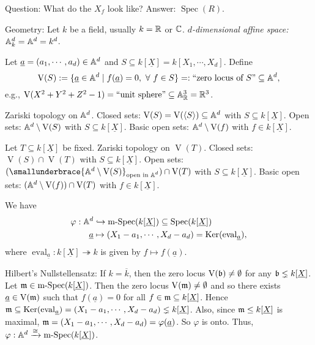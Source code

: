 \noindent Question: What do the $X_f$ look like? Answer: $\operatorname{Spec}(R)$.

\begin{remark}
    Geometry: Let $k$ be a field, usually $k = \mathbb{R}$ or $\mathbb{C}$. \emph{$d$-dimensional affine space:} $\mathbb{A}^d_k = \mathbb{A}^d = k^d$. \par 
    Let $\underline a = (a_1,\cdots,a_d) \in \mathbb{A}^d$ and $S \subseteq k[\underline X] = k[X_1,\cdots,X_d]$. Define
    \[\operatorname{V}(S) := \{\underline a \in \mathbb{A}^d \mid f(\underline a) = 0,\ \forall \  f \in S\} =: \text{``zero locus of $S$''} \subseteq \mathbb{A}^d,\] 
    e.g., $\operatorname{V}(X^2+Y^2+Z^2-1) = \text{``unit sphere''} \subseteq \mathbb{A}^3_{\mathbb{R}} = \mathbb{R}^3$. \par 
    Zariski topology on $\mathbb{A}^d$. Closed sets: $\operatorname{V}(S) = \operatorname{V}(\langle S \rangle) \subseteq \mathbb{A}^d$ with $S \subseteq k[\underline X]$. Open sets: $\mathbb{A}^d \setminus \operatorname{V}(S)$ with $S \subseteq k[\underline X]$. Basic open sets: $\mathbb{A}^d \setminus \operatorname{V}(f)$ with $f \in k[\underline X]$. \par 
    Let $T \subseteq k[\underline X]$ be fixed. Zariski topology on $\operatorname{V}(T)$. Closed sets: $\operatorname{V}(S) \cap \operatorname{V}(T)$ with $S \subseteq k[\underline X]$. Open sets: $(\smallunderbrace{\bbA^d \setminus \operatorname{V}(S)}_{\text{open in $\bbA^d$}}) \cap \operatorname{V}(T)$ with $S \subseteq k[\underline X]$.  Basic open sets: $(\mathbb{A}^d \setminus \operatorname{V}(f)) \cap \operatorname{V}(T)$ with $f \in k[\underline X]$. \par 
    We have 
    \begin{align*}
        \varphi: \mathbb{A}^d &\hookrightarrow \operatorname{m-Spec}(k[\underline X]) \subseteq \operatorname{Spec}(k[\underline X]) \\
        \underline a &\mapsto (X_1-a_1,\cdots,X_d-a_d) = \operatorname{Ker}(\operatorname{eval}_{\underline a}), 
    \end{align*}
    where $\operatorname{eval}_{\underline a}: k[\underline X] \twoheadrightarrow k$ is given by $f \mapsto f(\underline a)$. \par 
    Hilbert's Nullstellensatz: If $k = \overline k$, then the zero locus $\operatorname{V}(\mathfrak{b}) \neq \emptyset$ for any $\mathfrak{b} \lneq k[\underline X]$. Let $\mathfrak{m} \in \operatorname{m-Spec}(k[\underline X])$. Then the zero locus $\operatorname{V}(\mathfrak{m}) \neq \emptyset$ and so there exists $\underline a \in \operatorname{V}(\mathfrak{m})$ such that $f(\underline a) = 0$ for all $f \in \mathfrak{m} \subseteq k[\underline X]$. Hence $\mathfrak{m} \subseteq \operatorname{Ker}(\operatorname{eval}_{\underline a}) = (X_1-a_1,\cdots,X_d-a_d) \lneq k[\underline X]$. Also, since $\mathfrak{m} \leq k[\underline X]$ is maximal, $\mathfrak{m} = (X_1-a_1,\cdots,X_d-a_d) = \varphi(\underline a)$. So $\varphi$ is onto. Thus, $\varphi: \mathbb{A}^d \xrightarrow \cong \operatorname{m-Spec}(k[\underline X])$. \par 

\end{remark}

